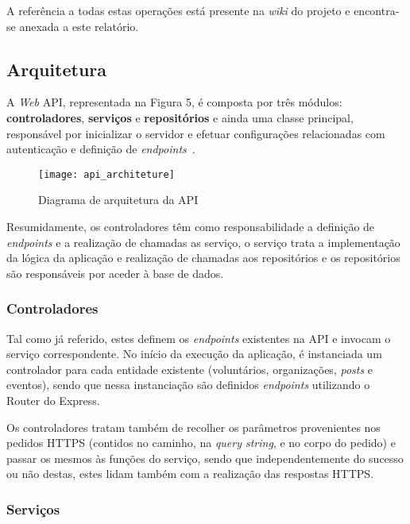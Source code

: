 A referência a todas estas operações está presente na \textit{wiki} do projeto e encontra-se anexada a este relatório.

\subsection{Arquitetura}

A \textit{Web} API, representada na Figura 5, é composta por três módulos: \textbf{controladores}, \textbf{serviços} e \textbf{repositórios} e ainda uma classe principal, responsável por inicializar o servidor e efetuar configurações relacionadas com autenticação e definição de \textit{endpoints}~\cite{Lauret2019,Block2014}.

\begin{figure}[h]
	\centering
	\texttt{[image: api\_architeture]}
	\caption{Diagrama de arquitetura da API}
\end{figure}

Resumidamente, os controladores têm como responsabilidade a definição de \textit{endpoints} e a realização de chamadas as serviço, o serviço trata a implementação da lógica da aplicação e realização de chamadas aos repositórios e os repositórios são responsáveis por aceder à base de dados.

\subsubsection{Controladores}

Tal como já referido, estes definem os \textit{endpoints} existentes na API e invocam o serviço correspondente. No início da execução da aplicação, é instanciada um controlador para cada entidade existente (voluntários, organizações, \textit{posts} e eventos), sendo que nessa instanciação são definidos \textit{endpoints} utilizando o Router do Express.

\medskip \par

Os controladores tratam também de recolher os parâmetros provenientes nos pedidos HTTPS (contidos no caminho, na \textit{query string}, e no corpo do pedido) e passar os mesmos às funções do serviço, sendo que independentemente do sucesso ou não destas, estes lidam também com a realização das respostas HTTPS.

\subsubsection{Serviços}

